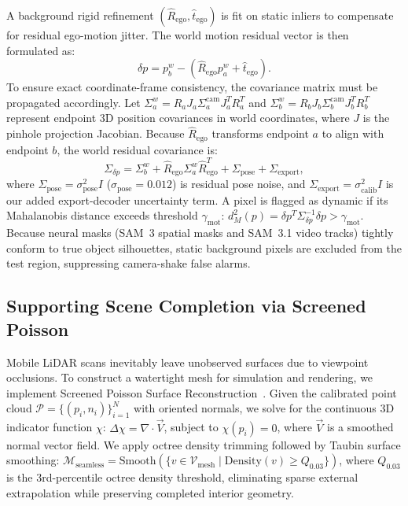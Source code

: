 \documentclass[conference]{IEEEtran}
\begin{document}
A background rigid refinement $(\hat{R}_{\mathrm{ego}}, \hat{t}_{\mathrm{ego}})$ is fit on static inliers to compensate for residual ego-motion jitter. The world motion residual vector is then formulated as:
\begin{equation}
\delta p = p_b^w - \left( \hat{R}_{\mathrm{ego}} p_a^w + \hat{t}_{\mathrm{ego}} \right).
\end{equation}
To ensure exact coordinate-frame consistency, the covariance matrix must be propagated accordingly. Let $\Sigma_a^w = R_a J_a \Sigma_a^{\mathrm{cam}} J_a^T R_a^T$ and $\Sigma_b^w = R_b J_b \Sigma_b^{\mathrm{cam}} J_b^T R_b^T$ represent endpoint 3D position covariances in world coordinates, where $J$ is the pinhole projection Jacobian. Because $\hat{R}_{\mathrm{ego}}$ transforms endpoint $a$ to align with endpoint $b$, the world residual covariance is:
\begin{equation}
\Sigma_{\delta p} = \Sigma_b^w + \hat{R}_{\mathrm{ego}} \Sigma_a^w \hat{R}_{\mathrm{ego}}^T + \Sigma_{\mathrm{pose}} + \Sigma_{\mathrm{export}},
\end{equation}
where $\Sigma_{\mathrm{pose}} = \sigma_{\mathrm{pose}}^2 I$ ($\sigma_{\mathrm{pose}} = 0.012$) is residual pose noise, and $\Sigma_{\mathrm{export}} = \sigma_{\mathrm{calib}}^2 I$ is our added export-decoder uncertainty term. A pixel is flagged as dynamic if its Mahalanobis distance exceeds threshold $\gamma_{\mathrm{mot}}$: $d_M^2(p) = \delta p^T \Sigma_{\delta p}^{-1} \delta p > \gamma_{\mathrm{mot}}$. Because neural masks (SAM~3 spatial masks and SAM~3.1 video tracks) tightly conform to true object silhouettes, static background pixels are excluded from the test region, suppressing camera-shake false alarms.

\subsection{Supporting Scene Completion via Screened Poisson}
\label{sec:inpainting}
Mobile LiDAR scans inevitably leave unobserved surfaces due to viewpoint occlusions. To construct a watertight mesh for simulation and rendering, we implement Screened Poisson Surface Reconstruction~\cite{kazhdan2013screened}. Given the calibrated point cloud $\mathcal{P} = \{(p_i, n_i)\}_{i=1}^N$ with oriented normals, we solve for the continuous 3D indicator function $\chi$: $\Delta \chi = \nabla \cdot \vec{V}$, subject to $\chi(p_i) = 0$, where $\vec{V}$ is a smoothed normal vector field. We apply octree density trimming followed by Taubin surface smoothing: $\mathcal{M}_{\mathrm{seamless}} = \mathrm{Smooth}(\{v \in \mathcal{V}_{\mathrm{mesh}} \mid \mathrm{Density}(v) \ge Q_{0.03}\})$, where $Q_{0.03}$ is the 3rd-percentile octree density threshold, eliminating sparse external extrapolation while preserving completed interior geometry.
\end{document}
